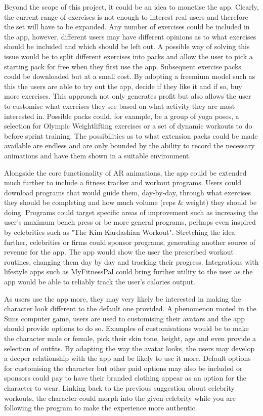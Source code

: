 \documentclass{l4proj}
\begin{document}
Beyond the scope of this project, it could be an idea to monetise the app. Clearly, the current range of exercises is not enough to interest real users and therefore the set will have to be expanded. Any number of exercises could be included in the app, however, different users may have different opinions as to what exercises should be included and which should be left out. A possible way of solving this issue would be to split different exercises into packs and allow the user to pick a starting pack for free when they first use the app. Subsequent exercise packs could be downloaded but at a small cost. By adopting a freemium model such as this the users are able to try out the app, decide if they like it and if so, buy more exercises. This approach not only generates profit but also allows the user to customise what exercises they see based on what activity they are most interested in. Possible packs could, for example, be a group of yoga poses, a selection for Olympic Weightlifting exercises or a set of dynamic workouts to do before sprint training. The possibilities as to what extension packs could be made available are endless and are only bounded by the ability to record the necessary animations and have them shown in a suitable environment. 


Alongside the core functionality of AR animations, the app could be extended much further to include a fitness tracker and workout programs. Users could download programs that would guide them, day-by-day, through what exercises they should be completing and how much volume (reps \& weight) they should be doing. Programs could target specific areas of improvement such as increasing the user's maximum bench press or be more general programs, perhaps even inspired by celebrities such as "The Kim Kardashian Workout". Stretching the idea further, celebrities or firms could sponsor programs, generating another source of revenue for the app. The app would show the user the prescribed workout routines, changing them day by day and tracking their progress. Integrations with lifestyle apps such as MyFitnessPal could bring further utility to the user as the app would be able to reliably track the user's calories output. 

As users use the app more, they may very likely be interested in making the character look different to the default one provided. A phenomenon rooted in the Sims computer game, users are used to customising their avatars and the app should provide options to do so. Examples of customisations would be to make the character male or female, pick their skin tone, height, age and even provide a selection of outfits. By adapting the way the avatar looks, the users may develop a deeper relationship with the app and be likely to use it more. Default options for customising the character but other paid options may also be included or sponsors could pay to have their branded clothing appear as an option for the character to wear. Linking back to the previous suggestion about celebrity workouts, the character could morph into the given celebrity while you are following the program to make the experience more authentic. 
\end{document}

